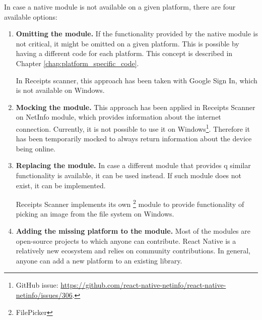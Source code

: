 \documentclass[
  digital, %
  table,   %
  oneside, %
  lof,     %
  lot,     %
]{fithesis3}
\begin{document}
In case a native module is not available on a given platform, there are four available options:
\begin{enumerate}
    \item \textbf{Omitting the module.} If the functionality provided by the native module is not critical, it might be omitted on a given platform. This is possible by having a different code for each platform. This concept is described in Chapter \ref{chap:platform_specific_code}.
    
    In Receipts scanner, this approach has been taken with Google Sign In, which is not available on Windows.
    
    \item \textbf{Mocking the module.}
    This approach has been applied in Receipts Scanner on NetInfo module, which provides information about the internet connection. Currently, it is not possible to use it on Windows\footnote{GitHub issue: \url{https://github.com/react-native-netinfo/react-native-netinfo/issues/306}.}. Therefore it has been temporarily mocked to always return information about the device being online.
    
    \item \textbf{Replacing the module.} In case a different module that provides q similar functionality is available, it can be used instead. If such module does not exist, it can be implemented.
    
    Receipts Scanner implements its own \footnote{FilePicker} module to provide functionality of picking an image from the file system on Windows.
    
    \item \textbf{Adding the missing platform to the module.}
    Most of the modules are open-source projects to which anyone can contribute. React Native is a relatively new ecosystem and relies on community contributions. In general, anyone can add a new platform to an existing library.
\end{enumerate}
\end{document}

